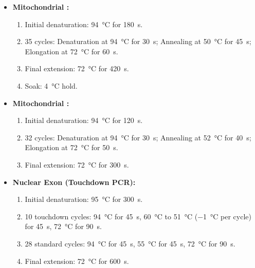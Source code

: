 \begin{itemize}
  \item \textbf{Mitochondrial :}
    \begin{enumerate}
      \item Initial denaturation: \SI{94}{\celsius} for \SI{180}{\second}.
      \item 35 cycles: Denaturation at \SI{94}{\celsius} for \SI{30}{\second}; Annealing at \SI{50}{\celsius} for \SI{45}{\second}; Elongation at \SI{72}{\celsius} for \SI{60}{\second}.
      \item Final extension: \SI{72}{\celsius} for \SI{420}{\second}.
      \item Soak: \SI{4}{\celsius} hold.
    \end{enumerate}

  \item \textbf{Mitochondrial :}
    \begin{enumerate}
      \item Initial denaturation: \SI{94}{\celsius} for \SI{120}{\second}.
      \item 32 cycles: Denaturation at \SI{94}{\celsius} for \SI{30}{\second}; Annealing at \SI{52}{\celsius} for \SI{40}{\second}; Elongation at \SI{72}{\celsius} for \SI{50}{\second}.
      \item Final extension: \SI{72}{\celsius} for \SI{300}{\second}.
    \end{enumerate}

  \item \textbf{Nuclear Exon  (Touchdown PCR):}
    \begin{enumerate}
      \item Initial denaturation: \SI{95}{\celsius} for \SI{300}{\second}.
      \item 10 touchdown cycles: \SI{94}{\celsius} for \SI{45}{\second}, \SI{60}{\celsius} to \SI{51}{\celsius} (\SI{-1}{\celsius} per cycle) for \SI{45}{\second}, \SI{72}{\celsius} for \SI{90}{\second}.
      \item 28 standard cycles: \SI{94}{\celsius} for \SI{45}{\second}, \SI{55}{\celsius} for \SI{45}{\second}, \SI{72}{\celsius} for \SI{90}{\second}.
      \item Final extension: \SI{72}{\celsius} for \SI{600}{\second}.
    \end{enumerate}
\end{itemize}
